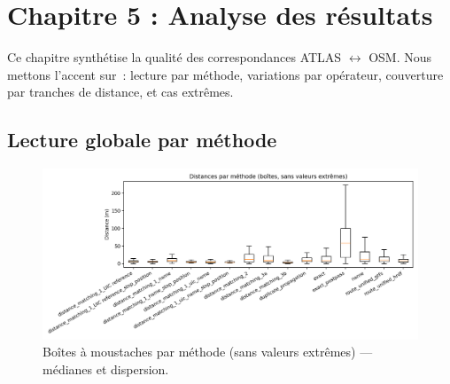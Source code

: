 \chapter{Chapitre 5 : Analyse des résultats}

Ce chapitre synthétise la qualité des correspondances ATLAS $\leftrightarrow$ OSM. Nous mettons l'accent sur : lecture par méthode, variations par opérateur, couverture par tranches de distance, et cas extrêmes.

\section{Lecture globale par méthode}

\begin{figure}[H]
    \centering
    \includegraphics[width=\textwidth]{../figures/chap5/distances_by_method_box.png}
    \caption[Boîtes par méthode]{Boîtes à moustaches par méthode (sans valeurs extrêmes) — médianes et dispersion.}
\end{figure}

